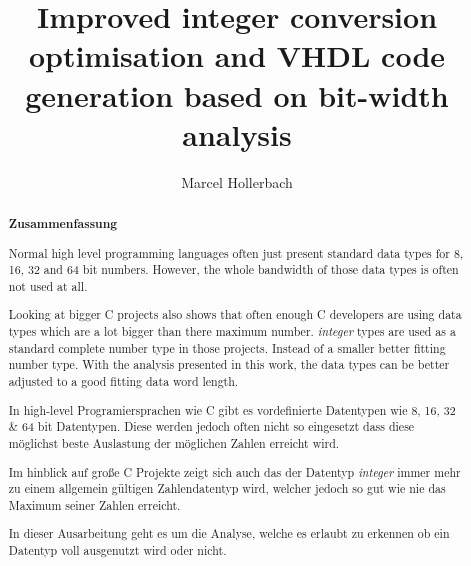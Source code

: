 \documentclass[parskip=full,12pt,a4paper,twoside,headings=openright]{scrreprt}
\title{Improved integer conversion optimisation and VHDL code generation based on bit-width analysis}
\author{Marcel Hollerbach}
\begin{document}
\begin{otherlanguage}{ngerman} %
\mytitlepage
\end{otherlanguage}

\begin{abstract}
\begin{center}\Huge\textbf{\textsf{Zusammenfassung}}
\end{center}
\vfill

Normal high level programming languages often just present standard data types for 8, 16, 32 and 64 bit numbers. However, the whole bandwidth of those data types is often not used at all. 

Looking at bigger C projects also shows that often enough C developers are using data types which are a lot bigger than there maximum number. \textit{integer} types are used as a standard complete number type in those projects. Instead of a smaller better fitting number type.
With the analysis presented in this work, the data types can be better adjusted to a good fitting data word length.
\vfill

In high-level Programiersprachen wie C gibt es vordefinierte Datentypen wie 8, 16, 32 \& 64 bit Datentypen. Diese werden jedoch often nicht so eingesetzt dass diese möglichst beste Auslastung der möglichen Zahlen erreicht wird.

Im hinblick auf große C Projekte zeigt sich auch das der Datentyp \textit{integer} immer mehr zu einem allgemein gültigen Zahlendatentyp wird, welcher jedoch so gut wie nie das Maximum seiner Zahlen erreicht.

In dieser Ausarbeitung geht es um die Analyse, welche es erlaubt zu erkennen ob ein Datentyp voll ausgenutzt wird oder nicht.

\end{abstract}

\tableofcontents









\end{document}
